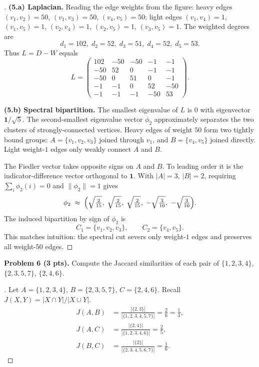 \documentclass[en,hazy,blue,12pt,normal]{../../elegantnote}
\begin{document}
\begin{proof}[\solutionname]

\textbf{(5.a) Laplacian.} Reading the edge weights from the figure: heavy edges $(v_1,v_2)=50$, $(v_1,v_3)=50$, $(v_4,v_5)=50$; light edges $(v_1,v_4)=1$, $(v_1,v_5)=1$, $(v_2,v_4)=1$, $(v_2,v_5)=1$, $(v_3,v_5)=1$. The weighted degrees are
\[
d_1=102,\;d_2=52,\;d_3=51,\;d_4=52,\;d_5=53.
\]
Thus $L=D-W$ equals
\[
L=
\begin{pmatrix}
102 & -50 & -50 & -1 & -1\\
-50 & 52 & 0 & -1 & -1\\
-50 & 0 & 51 & 0 & -1\\
-1 & -1 & 0 & 52 & -50\\
-1 & -1 & -1 & -50 & 53
\end{pmatrix}.
\]

\textbf{(5.b) Spectral bipartition.}
The smallest eigenvalue of $L$ is $0$ with eigenvector $\bm 1/\sqrt{5}$. The second-smallest eigenvalue vector $\phi_2$ approximately separates the two clusters of strongly-connected vertices. Heavy edges of weight $50$ form two tightly bound groups: $A=\{v_1,v_2,v_3\}$ joined through $v_1$, and $B=\{v_4,v_5\}$ joined directly. Light weight-$1$ edges only weakly connect $A$ and $B$.

The Fiedler vector takes opposite signs on $A$ and $B$. To leading order it is the indicator-difference vector orthogonal to $\bm 1$. With $|A|=3$, $|B|=2$, requiring $\sum_i\phi_2(i)=0$ and $\|\phi_2\|=1$ gives
\[
\phi_2 \;\approx\; \Bigl(\sqrt{\tfrac{2}{15}},\;\sqrt{\tfrac{2}{15}},\;\sqrt{\tfrac{2}{15}},\;-\sqrt{\tfrac{3}{10}},\;-\sqrt{\tfrac{3}{10}}\Bigr)
.
\]
The induced bipartition by sign of $\phi_2$ is
\[
C_1=\{v_1,v_2,v_3\},\qquad C_2=\{v_4,v_5\}.
\]
This matches intuition: the spectral cut severs only weight-$1$ edges and preserves all weight-$50$ edges.
\end{proof}

\begin{homework}
\textbf{Problem 6 (3 pts).} Compute the Jaccard similarities of each pair of $\{1,2,3,4\}$, $\{2,3,5,7\}$, $\{2,4,6\}$.
\end{homework}

\begin{proof}[\solutionname]
Let $A=\{1,2,3,4\},\,B=\{2,3,5,7\},\,C=\{2,4,6\}$. Recall $J(X,Y)=|X\cap Y|/|X\cup Y|$.
\begin{align*}
J(A,B)&=\frac{|\{2,3\}|}{|\{1,2,3,4,5,7\}|}=\frac{2}{6}=\frac{1}{3},\\[2pt]
J(A,C)&=\frac{|\{2,4\}|}{|\{1,2,3,4,6\}|}=\frac{2}{5},\\[2pt]
J(B,C)&=\frac{|\{2\}|}{|\{2,3,4,5,6,7\}|}=\frac{1}{6}.
\end{align*}
\end{proof}
\end{document}
